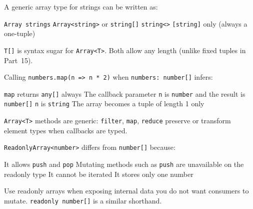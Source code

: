 \question[4]
A generic array type for strings can be written as:
\begin{choices}
  \choice \lstinline[style=tsinline]|Array strings|
  \CorrectChoice \lstinline[style=tsinline]|Array<string>| or \lstinline[style=tsinline]|string[]|
  \choice \lstinline[style=tsinline]|string<>|
  \choice \lstinline[style=tsinline]|[string]| only (always a one-tuple)
\end{choices}
\begin{solution}
  \lstinline[style=tsinline]|T[]| is syntax sugar for \lstinline[style=tsinline]|Array<T>|. Both allow any length (unlike fixed tuples in Part~15).
\end{solution}

\question[4]
Calling \lstinline[style=tsinline]|numbers.map(n => n * 2)| when \lstinline[style=tsinline]|numbers: number[]| infers:
\begin{choices}
  \choice \lstinline[style=tsinline]|map| returns \lstinline[style=tsinline]|any[]| always
  \CorrectChoice The callback parameter \lstinline[style=tsinline]|n| is \lstinline[style=tsinline]|number| and the result is \lstinline[style=tsinline]|number[]|
  \choice \lstinline[style=tsinline]|n| is \lstinline[style=tsinline]|string|
  \choice The array becomes a tuple of length 1 only
\end{choices}
\begin{solution}
  \lstinline[style=tsinline]|Array<T>| methods are generic: \lstinline[style=tsinline]|filter|, \lstinline[style=tsinline]|map|, \lstinline[style=tsinline]|reduce| preserve or transform element types when callbacks are typed.
\end{solution}

\question[4]
\lstinline[style=tsinline]|ReadonlyArray<number>| differs from \lstinline[style=tsinline]|number[]| because:
\begin{choices}
  \choice It allows \lstinline[style=tsinline]|push| and \lstinline[style=tsinline]|pop|
  \CorrectChoice Mutating methods such as \lstinline[style=tsinline]|push| are unavailable on the readonly type
  \choice It cannot be iterated
  \choice It stores only one number
\end{choices}
\begin{solution}
  Use readonly arrays when exposing internal data you do not want consumers to mutate. \lstinline[style=tsinline]|readonly number[]| is a similar shorthand.
\end{solution}

